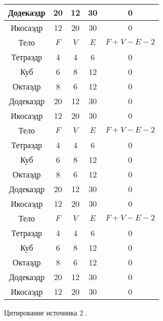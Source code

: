 \begin{longtable}[H]{|c|c|c|c|c|}
    Додекаэдр & 20  & 12   & 30  & 0         \\ \hline
    Икосаэдр  & 12  & 20   & 30  & 0         \\ \hline
    Тело      & $F$ & $V$  & $E$ & $F+V-E-2$ \\ \hline
    Тетраэдр  & 4   & 4    & 6   & 0         \\ \hhline{~-~-~}
    Куб       & 6   & 8    & 12  & 0         \\ \hhline{--~~~}
    Октаэдр   & 8   & 6    & 12  & 0         \\ \hhline{-----}
    Додекаэдр & 20  & 12   & 30  & 0         \\ \hline
    Икосаэдр  & 12  & 20   & 30  & 0         \\ \hline
    Тело      & $F$ & $V$  & $E$ & $F+V-E-2$ \\ \hline
    Тетраэдр  & 4   & 4    & 6   & 0         \\ \hhline{~-~-~}
    Куб       & 6   & 8    & 12  & 0         \\ \hhline{--~~~}
    Октаэдр   & 8   & 6    & 12  & 0         \\ \hhline{-----}
    Додекаэдр & 20  & 12   & 30  & 0         \\ \hline
    Икосаэдр  & 12  & 20   & 30  & 0         \\ \hline
    Тело      & $F$ & $V$  & $E$ & $F+V-E-2$ \\ \hline
    Тетраэдр  & 4   & 4    & 6   & 0         \\ \hhline{~-~-~}
    Куб       & 6   & 8    & 12  & 0         \\ \hhline{--~~~}
    Октаэдр   & 8   & 6    & 12  & 0         \\ \hhline{-----}
    Додекаэдр & 20  & 12   & 30  & 0         \\ \hline
    Икосаэдр  & 12  & 20   & 30  & 0         \\ \hline
\end{longtable}

Цитирование источника 2 \cite{Article3}.
